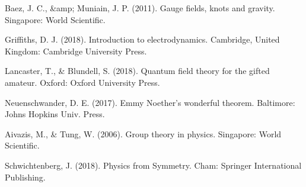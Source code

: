 \documentclass[a4paper,oneside,11pt, numbers=noenddot]{scrreprt}%
\begin{document}



\begin{thebibliography}{9}
	
	 Baez, J. C., &amp; Muniain, J. P. (2011). Gauge fields, knots and gravity. Singapore: World Scientific.
	
	 Griffiths, D. J. (2018). Introduction to electrodynamics. Cambridge, United Kingdom: Cambridge University Press.
	
	 Lancaster, T., \& Blundell, S. (2018). Quantum field theory for the gifted amateur. Oxford: Oxford University Press.
	
	 Neuenschwander, D. E. (2017). Emmy Noether's wonderful theorem. Baltimore: Johns Hopkins Univ. Press.
	
	  Aivazis, M., \& Tung, W. (2006). Group theory in physics. Singapore: World Scientific.
	
	 Schwichtenberg, J. (2018). Physics from Symmetry. Cham: Springer International Publishing.
	
	

\end{thebibliography}
\end{document}
